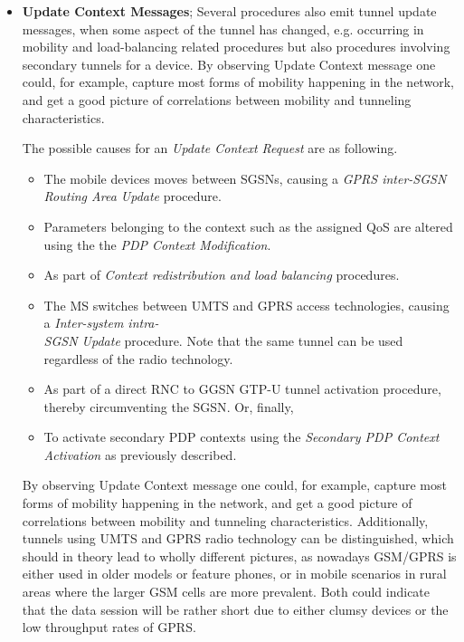 \begin{itemize}
\item \textbf{Update Context Messages}; Several procedures also emit tunnel update messages, when some aspect of the tunnel has changed, e.g. occurring in mobility and load-balancing related procedures but also procedures involving secondary tunnels for a device.
By observing Update Context message one could, for example, capture most forms of mobility happening in the network, and get a good picture of correlations between mobility and tunneling characteristics. 

The possible causes for an \textit{Update Context Request} are as following.

\begin{itemize}
	\item The mobile devices moves between \glspl{SGSN}, causing a \textit{GPRS inter-SGSN Routing Area Update} procedure.
	\item Parameters belonging to the context such as the assigned \gls{QoS} are altered using the the \textit{PDP Context Modification}.
	\item As part of \textit{Context redistribution and load balancing} procedures.
	\item The \gls{MS} switches between \gls{UMTS} and \gls{GPRS} access technologies, causing a \textit{Inter-system intra- \\SGSN Update} procedure. Note that the same tunnel can be used regardless of the radio technology.
	\item As part of a direct \gls{RNC} to \gls{GGSN} GTP-U tunnel activation procedure, thereby circumventing the \gls{SGSN}. Or, finally, 
	\item To activate secondary PDP contexts using the \textit{Secondary PDP Context Activation} as previously described. 
\end{itemize}

By observing Update Context message one could, for example, capture most forms of mobility happening in the network, and get a good picture of correlations between mobility and tunneling characteristics. Additionally, tunnels using \gls{UMTS} and \gls{GPRS} radio technology can be distinguished, which should in theory lead to wholly different pictures, as nowadays GSM/GPRS is either used in older models or feature phones, or in mobile scenarios in rural areas where the larger GSM cells are more prevalent. Both could indicate that the data session will be rather short  due to either clumsy devices or the low throughput rates of \gls{GPRS}.
\end{itemize}

